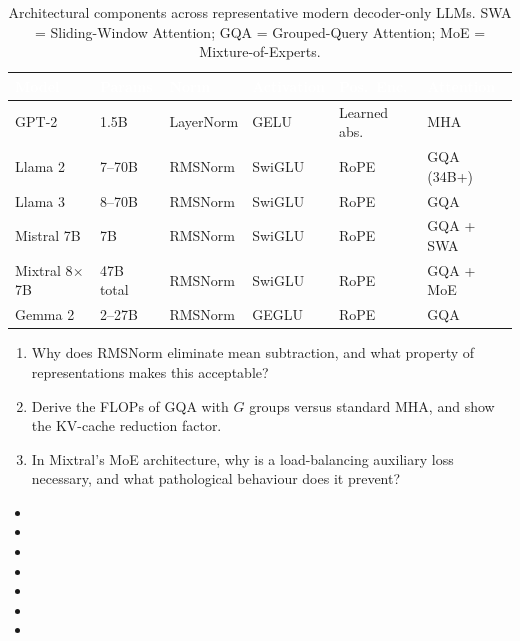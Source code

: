 \documentclass[11pt,a4paper]{article}
\begin{document}
	\begin{table}[ht]
		\centering
		\small\sffamily
		\renewcommand{\arraystretch}{1.3}
		\begin{tabular}{@{}L{2.8cm} L{1.8cm} L{2.0cm} L{2.2cm} L{2.0cm} L{2.5cm}@{}}
			\toprule
			\textcolor{white}{\textbf{Model}} &
			\textcolor{white}{\textbf{Params}} &
			\textcolor{white}{\textbf{Norm}} &
			\textcolor{white}{\textbf{Activation}} &
			\textcolor{white}{\textbf{Pos.\ Enc.}} &
			\textcolor{white}{\textbf{Attention}} \\
			\midrule
			GPT-2        & 1.5B   & LayerNorm  & GELU   & Learned abs.  & MHA \\
			Llama 2      & 7--70B & RMSNorm    & SwiGLU & RoPE          & GQA (34B+) \\
			Llama 3      & 8--70B & RMSNorm    & SwiGLU & RoPE          & GQA \\
			Mistral 7B   & 7B     & RMSNorm    & SwiGLU & RoPE          & GQA + SWA \\
			Mixtral 8$\times$7B & 47B total & RMSNorm & SwiGLU & RoPE & GQA + MoE \\
			Gemma 2      & 2--27B & RMSNorm    & GEGLU  & RoPE          & GQA \\
			\bottomrule
		\end{tabular}
		\caption{Architectural components across representative modern decoder-only LLMs. SWA = Sliding-Window Attention; GQA = Grouped-Query Attention; MoE = Mixture-of-Experts.}
		\label{tab:llm_architectures}
	\end{table}

	\begin{checkpoint}
		\begin{enumerate}
			\item Why does RMSNorm eliminate mean subtraction, and what property of representations makes this acceptable?
			\item Derive the FLOPs of GQA with $G$ groups versus standard MHA, and show the KV-cache reduction factor.
			\item In Mixtral's MoE architecture, why is a load-balancing auxiliary loss necessary, and what pathological behaviour does it prevent?
		\end{enumerate}
	\end{checkpoint}

	\begin{sourcesbox}
		\small
		\begin{itemize}[nosep]
			\item {}
			\item {}
			\item {}
			\item {}
			\item {}
			\item {}
			\item {}
		\end{itemize}
	\end{sourcesbox}
\end{document}
